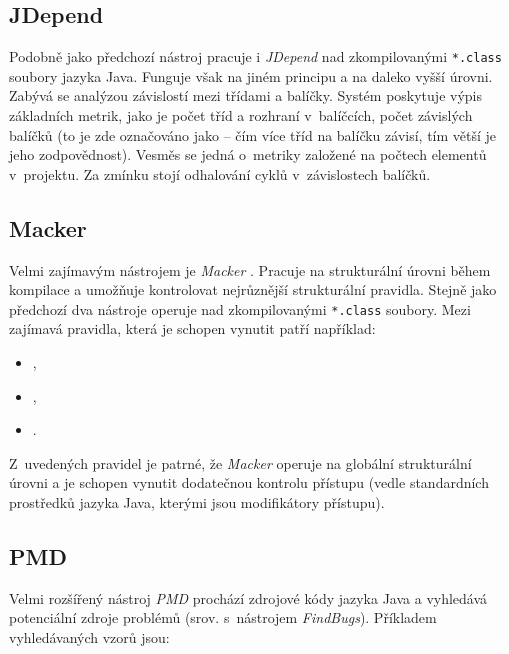 \subsection{JDepend}
Podobně jako předchozí nástroj pracuje i \emph{JDepend} \cite{existingtools:jdepend} nad zkompilovanými \verb+*.class+ soubory jazyka Java. Funguje však na jiném principu a na daleko vyšší úrovni. Zabývá se analýzou závislostí mezi třídami a balíčky. Systém poskytuje výpis základních metrik, jako je počet tříd a rozhraní v~balíčcích, počet závislých balíčků (to je zde označováno jako  -- čím více tříd na balíčku závisí, tím větší je jeho zodpovědnost). Vesměs se jedná o~metriky založené na počtech elementů v~projektu. Za zmínku stojí odhalování cyklů v~závislostech balíčků.

\subsection{Macker}
Velmi zajímavým nástrojem je \emph{Macker} \cite{existingtools:macker}. Pracuje na strukturální úrovni během kompilace a umožňuje kontrolovat nejrůznější strukturální pravidla. Stejně jako předchozí dva nástroje operuje nad zkompilovanými \verb+*.class+ soubory. Mezi zajímavá pravidla, která je schopen vynutit patří například:

\begin{itemize}
\item {},
\item {},
\item {}.
\end{itemize}

Z~uvedených pravidel je patrné, že \emph{Macker} operuje na globální strukturální úrovni a je schopen vynutit dodatečnou kontrolu přístupu (vedle standardních prostředků jazyka Java, kterými jsou modifikátory přístupu).

\subsection{PMD}
Velmi rozšířený nástroj \emph{PMD} \cite{existingtools:pmd} prochází zdrojové kódy jazyka Java a vyhledává potenciální zdroje problémů (srov. s~nástrojem \emph{FindBugs}). Příkladem vyhledávaných vzorů jsou:


